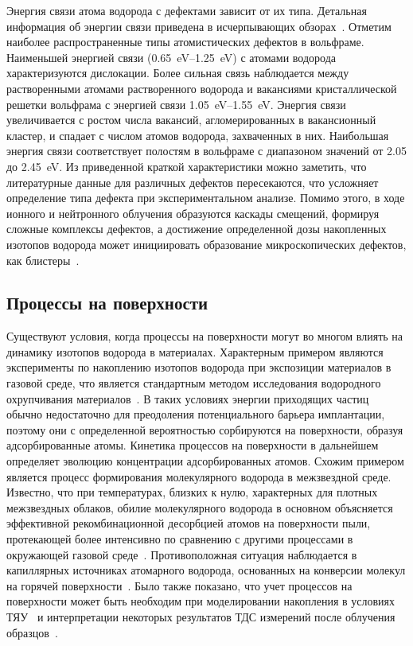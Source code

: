 Энергия связи атома водорода с дефектами зависит от их типа. Детальная информация об энергии связи приведена в исчерпывающих обзорах~\cite{Ogorodnikova2015,Li2020,Persianova2024}. Отметим наиболее распространенные типы атомистических дефектов в вольфраме. Наименьшей энергией связи (\SIrange{0.65}{1.25}{\electronvolt}) с атомами водорода характеризуются дислокации. Более сильная связь наблюдается между растворенными атомами растворенного водорода и вакансиями кристаллической решетки вольфрама с энергией связи \SIrange{1.05}{1.55}{\electronvolt}. Энергия связи увеличивается с ростом числа вакансий, агломерированных в вакансионный кластер, и спадает с числом атомов водорода, захваченных в них. Наибольшая энергия связи соответствует полостям в вольфраме с диапазоном значений от \num{2.05} до \SI{2.45}{\electronvolt}. Из приведенной краткой характеристики можно заметить, что литературные данные для различных дефектов пересекаются, что усложняет определение типа дефекта при экспериментальном анализе. Помимо этого, в ходе ионного и нейтронного облучения образуются каскады смещений, формируя сложные комплексы дефектов, а достижение определенной дозы накопленных изотопов водорода может инициировать образование микроскопических дефектов, как блистеры~\cite{Wang2001}. 

\subsection{Процессы на поверхности}\label{subsec:ch1/sec4/subsec3}

Существуют условия, когда процессы на поверхности могут во многом влиять на динамику изотопов водорода в материалах. Характерным примером являются эксперименты по накоплению изотопов водорода при экспозиции материалов в газовой среде, что является стандартным методом исследования водородного охрупчивания материалов~\cite{Briant2002,Louthan2008}. В таких условиях энергии приходящих частиц обычно недостаточно для преодоления потенциального барьера имплантации, поэтому они с определенной вероятностью сорбируются на поверхности, образуя адсорбированные атомы. Кинетика процессов на поверхности в дальнейшем определяет эволюцию концентрации адсорбированных атомов. Схожим примером является процесс формирования молекулярного водорода в межзвездной среде. Известно, что при температурах, близких к нулю, характерных для плотных межзвездных облаков, обилие молекулярного водорода в основном объясняется эффективной рекомбинационной десорбцией атомов на поверхности пыли, протекающей более интенсивно по сравнению с другими процессами в окружающей газовой среде~\cite{Katz1999, Perets2005, Hama2013}. Противоположная ситуация наблюдается в капиллярных источниках атомарного водорода, основанных на конверсии молекул на горячей поверхности~\cite{Tschersich2000, Tschersich2008}. Было также показано, что учет процессов на поверхности может быть необходим при моделировании накопления в условиях ТЯУ~\cite{Guterl2019} и интерпретации некоторых результатов ТДС измерений после облучения образцов~\cite{Hodille2017, Matveev2018}. 

